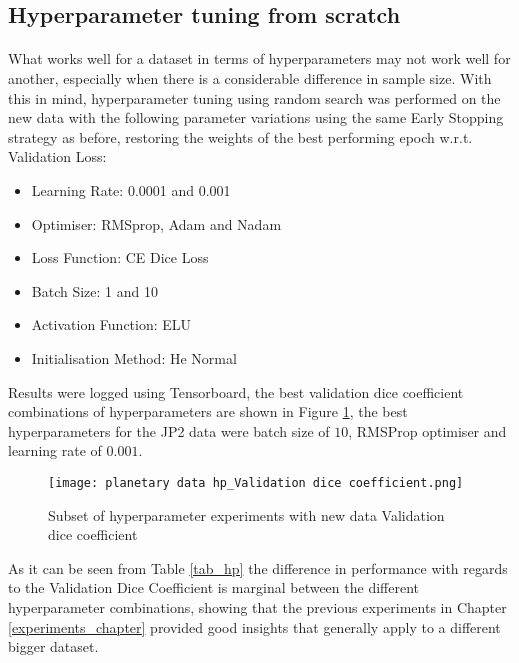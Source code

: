 \subsection{Hyperparameter tuning from scratch} \label{hp_new_data}
\paragraph{}
What works well for a dataset in terms of hyperparameters may not work well for another, especially when there is a considerable difference in sample size. With this in mind, hyperparameter tuning using random search was performed on the new data with the following parameter variations using the same Early Stopping strategy as before, restoring the weights of the best performing epoch \gls{w.r.t.} Validation Loss:
\begin{itemize}
    \item{Learning Rate: 0.0001 and 0.001}
    \item{Optimiser: RMSprop, Adam and Nadam}
    \item{Loss Function: CE Dice Loss}
    \item{Batch Size: 1 and 10}
    \item{Activation Function: ELU}
    \item{Initialisation Method: He Normal}
\end{itemize}

Results were logged using Tensorboard, the best validation dice coefficient combinations of hyperparameters are shown in Figure \ref{hp}, the best hyperparameters for the \gls{JP2} data were batch size of $10$, \gls{RMSProp} optimiser and learning rate of $0.001$.

\begin{figure}[hbt!]
    \centering
    \texttt{[image: planetary data hp\_Validation dice coefficient.png]}
    \caption{Subset of hyperparameter experiments with new data Validation dice coefficient}
    \label{hp}
\end{figure}
As it can be seen from Table \ref{tab_hp} the difference in performance with regards to the Validation Dice Coefficient is marginal between the different hyperparameter combinations, showing that the previous experiments in Chapter \ref{experiments_chapter} provided good insights that generally apply to a different bigger dataset.

